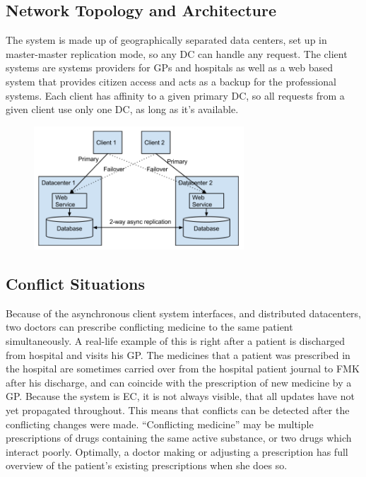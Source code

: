 \documentclass[11pt,a4paper]{report}
\begin{document}
\subsection{Network Topology and Architecture}
The system is made up of geographically separated data centers, set up in master-master replication mode, so any DC can handle any request.
The client systems are systems providers for GPs and hospitals as well as a web based system that provides citizen access and acts as a backup for the professional systems.
Each client has affinity to a given primary DC, so all requests from a given client use only one DC, as long as it's available.
\begin{figure}[!h]
	\centering
	\includegraphics[width=0.7\textwidth]{./img/image3.png}
\end{figure}
\subsection{Conflict Situations}
Because of the asynchronous client system interfaces, and distributed datacenters, two doctors can prescribe conflicting medicine to the same patient simultaneously. A real-life example of this is right after a patient is discharged from hospital and visits his GP. The medicines that a patient was prescribed in the hospital are sometimes carried over from the hospital patient journal to FMK after his discharge, and can coincide with the prescription of new medicine by a GP.
Because the system is EC, it is not always visible, that all updates have not yet propagated throughout. This means that conflicts can be detected after the conflicting changes were made.
``Conflicting medicine'' may be multiple prescriptions of drugs containing the same active substance, or two drugs which interact poorly. Optimally, a doctor making or adjusting a prescription has full overview of the patient's existing prescriptions when she does so.
\end{document}
